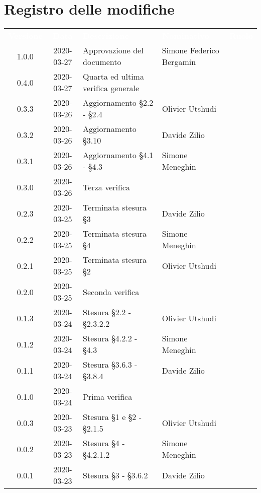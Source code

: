 \section*{Registro delle modifiche}
{
	\centering
	\begin{longtable}{ c c  C{4cm}  C{3cm}  C{3.5cm} }
		\textcolor{white}{\textbf{Versione}} & \textcolor{white}{\textbf{Data}} & \textcolor{white}{\textbf{Descrizione}} & \textcolor{white}{\textbf{Nominativo}} & \textcolor{white}{\textbf{Ruolo}}\\
    1.0.0 & 2020-03-27 & Approvazione del documento & Simone Federico Bergamin &\RdP{} \\
    	0.4.0 & 2020-03-27 & Quarta ed ultima verifica generale &  &\ver{}\\
    	0.3.3 & 2020-03-26 & Aggiornamento \S 2.2 - \S 2.4 & Olivier Utshudi &\adm{}\\
		0.3.2 & 2020-03-26 & Aggiornamento \S 3.10 & Davide Zilio &\adm{}\\
		0.3.1 & 2020-03-26 & Aggiornamento \S 4.1 - \S 4.3  & Simone Meneghin &\adm{}\\
		0.3.0 & 2020-03-26 & Terza verifica &  &\ver{}\\
		0.2.3 & 2020-03-25 & Terminata stesura \S 3  & Davide Zilio &\adm{}\\
    	0.2.2 & 2020-03-25 & Terminata stesura \S 4 & Simone Meneghin &\adm{}\\	
   		0.2.1 & 2020-03-25 & Terminata stesura \S 2 & Olivier Utshudi &\adm{}\\
   		0.2.0 & 2020-03-25 & Seconda verifica &  &\ver{}\\
		0.1.3 & 2020-03-24 & Stesura \S 2.2 - \S 2.3.2.2 & Olivier Utshudi &\adm{}\\
		0.1.2 & 2020-03-24 & Stesura \S 4.2.2 - \S 4.3 & Simone Meneghin &\adm{}\\		
		0.1.1 & 2020-03-24 & Stesura \S 3.6.3 - \S 3.8.4 & Davide Zilio &\adm{}\\
		0.1.0 & 2020-03-24 & Prima verifica &  &\ver{}\\
		0.0.3 & 2020-03-23 & Stesura \S 1 e \S 2 - \S 2.1.5 & Olivier Utshudi &\adm{}\\
		0.0.2 & 2020-03-23 & Stesura \S 4 - \S 4.2.1.2 & Simone Meneghin &\adm{}\\
		0.0.1 & 2020-03-23 & Stesura \S 3 - \S 3.6.2 & Davide Zilio &\adm{}\\		
	\end{longtable}
}